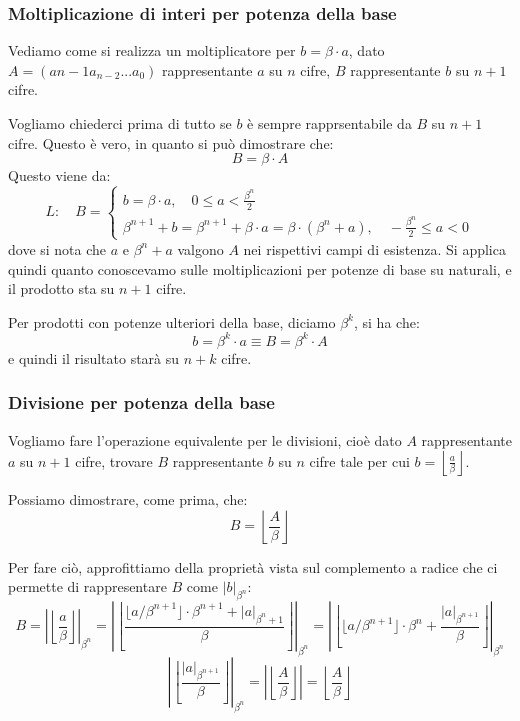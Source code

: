 \documentclass[a4paper,11pt]{article}
\begin{document}
\subsubsection{Moltiplicazione di interi per potenza della base}
Vediamo come si realizza un moltiplicatore per $b = \beta \cdot a$, dato $A = \left(a{n-1} a_{n-2} ... a_0 \right)$ rappresentante $a$ su $n$ cifre, $B$ rappresentante $b$ su $n+1$ cifre.

Vogliamo chiederci prima di tutto se $b$ è sempre rapprsentabile da $B$ su $n+1$ cifre. Questo è vero, in quanto si può dimostrare che:
$$
B = \beta \cdot A
$$
Questo viene da:
$$
L: \quad B =
\begin{cases}
	b = \beta \cdot a, \quad 0 \leq a < \frac{\beta^n}{2} \\ 
	\beta^{n+1} + b = \beta^{n+1} + \beta \cdot a = \beta \cdot \left( \beta^n + a \right), \quad -\frac{\beta^n}{2} \leq a < 0
\end{cases}
$$
dove si nota che $a$ e $\beta^n + a$ valgono $A$ nei rispettivi campi di esistenza.
Si applica quindi quanto conoscevamo sulle moltiplicazioni per potenze di base su naturali, e il prodotto sta su $n+1$ cifre.

Per prodotti con potenze ulteriori della base, diciamo $\beta^k$, si ha che:
$$
b = \beta^k \cdot a \equiv B = \beta^k \cdot A
$$
e quindi il risultato starà su $n + k$ cifre.

\subsubsection{Divisione per potenza della base}
Vogliamo fare l'operazione equivalente per le divisioni, cioè dato $A$ rappresentante $a$ su $n+1$ cifre, trovare $B$ rappresentante $b$ su $n$ cifre tale per cui $b = \left\lfloor \frac{a}{\beta} \right\rfloor$.

Possiamo dimostrare, come prima, che:
$$
B = \left\lfloor \frac{A}{\beta} \right\rfloor
$$

Per fare ciò, approfittiamo della proprietà vista sul complemento a radice che ci permette di rappresentare $B$ come $|b|_{\beta^n}$:
$$
B = \left| \left\lfloor \frac{a}{\beta} \right\rfloor \right|_{\beta^n} = \left| \left\lfloor \frac{ \lfloor a/\beta^{n+1} \rfloor \cdot \beta^{n+1} + |a|_{\beta^n+1} }{\beta} \right\rfloor \right|_{\beta^n} = \left| \left\lfloor \lfloor a / \beta^{n+1} \rfloor \cdot \beta^n + \frac{|a|_{\beta^{n+1}}}{\beta} \right\rfloor  \right|_{\beta^n}
$$
$$
\left| \left\lfloor \frac{|a|_{\beta^{n+1}}}{\beta} \right\rfloor  \right|_{\beta^n}
= \left| \left\lfloor \frac{A}{\beta} \right\rfloor \right| = \left\lfloor \frac{A}{\beta} \right\rfloor
$$
\end{document}
